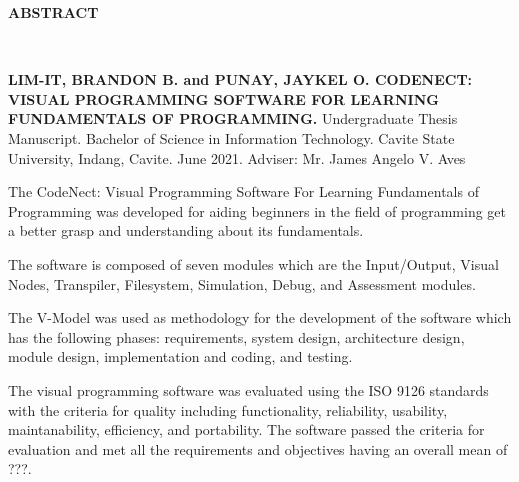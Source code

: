 \begin{doublespace}
	\thispagestyle{empty}

	\begin{center}
		\textbf{ABSTRACT}
	\end{center}
	\leavevmode\\

	\begin{singlespace}
		\parbox{\textwidth}{
		\justify
		\textbf{LIM-IT, BRANDON B. and PUNAY, JAYKEL O. CODENECT: VISUAL
		PROGRAMMING SOFTWARE FOR LEARNING FUNDAMENTALS OF PROGRAMMING.}
		Undergraduate Thesis Manuscript.  Bachelor of Science in Information
		Technology. Cavite State University, Indang, Cavite. June 2021. Adviser: Mr.
		James Angelo V. Aves}
	\end{singlespace}

	\justify
	\hphantom{invisible text}

	\parx
	The CodeNect: Visual Programming Software For Learning Fundamentals of
	Programming was developed for aiding beginners in the field of programming
	get a better grasp and understanding about its fundamentals.

	\parx
	The software is composed of seven modules which are the Input/Output, Visual
	Nodes, Transpiler, Filesystem, Simulation, Debug, and Assessment modules.

	\parx
	The V-Model was used as methodology for the development of the software which
	has the following phases: requirements, system design, architecture design, module
	design, implementation and coding, and testing.

	\parx
	The visual programming software was evaluated using the ISO 9126 standards with the
	criteria for quality including functionality, reliability, usability, maintanability,
	efficiency, and portability. The software passed the criteria for evaluation and met
	all the requirements and objectives having an overall mean of ???.
\end{doublespace}
